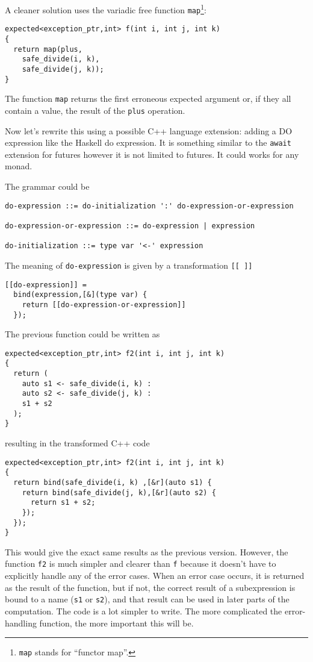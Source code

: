 \documentclass[a4paper,10pt]{article}
\newcommand{\cpp}[1]{\lstinline{#1}}
\begin{document}
A cleaner solution uses the variadic free function \cpp{map}\footnote{\cpp{map} stands for ``functor map''.}:

\begin{lstlisting}
expected<exception_ptr,int> f(int i, int j, int k)
{
  return map(plus,
    safe_divide(i, k), 
    safe_divide(j, k));
}
\end{lstlisting}

The function \cpp{map} returns the first erroneous expected argument or, if they all contain a value, the result of the \cpp{plus} operation.


Now let's rewrite this using a possible C++ language extension: adding a DO expression like the Haskell do expression. It is something similar  to the \cpp{await} extension for futures however it is not limited to futures. It could works for any monad.   

The grammar could be

\begin{lstlisting}
do-expression ::= do-initialization ':' do-expression-or-expression

do-expression-or-expression ::= do-expression | expression

do-initialization ::= type var '<-' expression
\end{lstlisting}

The meaning of \cpp{do-expression}  is given by a transformation \cpp{[[ ]]}

\begin{lstlisting}
[[do-expression]] =
  bind(expression,[&](type var) {
    return [[do-expression-or-expression]]
  });
\end{lstlisting}

The previous function could be written as

\begin{lstlisting}
expected<exception_ptr,int> f2(int i, int j, int k)
{
  return (
    auto s1 <- safe_divide(i, k) :
    auto s2 <- safe_divide(j, k) :
    s1 + s2
  );
}
\end{lstlisting}

resulting in the transformed C++ code

\begin{lstlisting}
expected<exception_ptr,int> f2(int i, int j, int k)
{
  return bind(safe_divide(i, k) ,[&r](auto s1) {
    return bind(safe_divide(j, k),[&r](auto s2) {
      return s1 + s2;
    });
  }); 
}
\end{lstlisting}

This would give the exact same results as the previous version. However, the function \cpp{f2} is much simpler and clearer than \cpp{f} because it doesn't have to explicitly handle any of the error cases. When an error case occurs, it is returned as the result of the function, but if not, the correct result of a subexpression is bound to a name (\cpp{s1} or \cpp{s2}), and that result can be used in later parts of the computation. The code is a lot simpler to write. The more complicated the error-handling function, the more important this will be.
\end{document}
